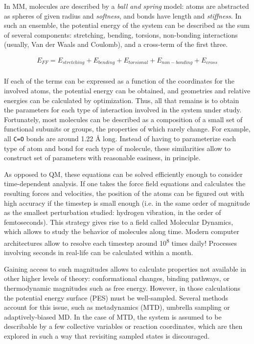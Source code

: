 In MM, molecules are described by a \textit{ball and spring} model: atoms are abstracted as spheres of given radius and \textit{softness}, and bonds have length and \textit{stiffness}. In such an ensemble, the potential energy of the system can be described as the sum of several components: stretching, bending, torsions, non-bonding interactions (usually, Van der Waals and Coulomb), and a cross-term of the first three.

 \begin{align}
	E_{FF}=E_{stretching}+E_{bending}+E_{torsional}+E_{non-bonding}+E_{cross} \\ \tag{Force field energy}
\end{align}

If each of the terms can be expressed as a function of the coordinates for the involved atoms, the potential energy can be obtained, and geometries and relative energies can be calculated by optimization. Thus, all that remains is to obtain the parameters for each type of interaction involved in the system under study. Fortunately, most molecules can be described as a composition of a small set of functional subunits or groups, the properties of which rarely change. For example, all \texttt{C=O} bonds are around 1.22 Å long. Instead of having to parameterize each type of atom and bond for each type of molecule, these similarities allow to construct set of parameters with reasonable easiness, in principle.

As opposed to QM, these equations can be solved efficiently enough to consider time-dependent analysis. If one takes the force field equations and calculates the resulting forces and velocities, the position of the atoms can be figured out with high accuracy if the timestep is small enough (i.e. in the same order of magnitude as the smallest perturbation studied: hydrogen vibration, in the order of femtoseconds). This strategy gives rise to a field called Molecular Dynamics, which allows to study the behavior of molecules along time. Modern computer architectures allow to resolve each timestep around 10\textsuperscript{8} times daily! Processes involving seconds in real-life can be calculated within a month.

Gaining access to such magnitudes allows to calculate properties not available in other higher levels of theory: conformational changes, binding pathways, or thermodynamic magnitudes such as free energy. However, in those calculations the potential energy surface (PES) must be well-sampled. Several methods account for this issue, such as metadynamics (MTD), umbrella sampling or adaptively-biased MD. In the case of MTD, the system is assumed to be describable by a few collective variables or reaction coordinates, which are then explored in such a way that revisiting sampled states is discouraged.

